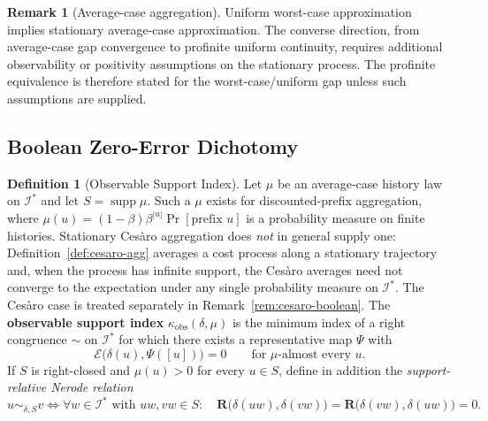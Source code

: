 \documentclass[12pt]{article}
\theoremstyle{definition}
\newtheorem{definition}[theorem]{Definition}
\newtheorem{remark}[theorem]{Remark}
\begin{document}
\begin{remark}[Average-case aggregation]
\label{rem:average-profinite}
Uniform worst-case approximation implies stationary average-case
approximation.  The converse direction, from average-case gap convergence to
profinite uniform continuity, requires additional observability or positivity
assumptions on the stationary process.  The profinite equivalence is therefore
stated for the worst-case/uniform gap unless such assumptions are supplied.
\end{remark}

\subsection{Boolean Zero-Error Dichotomy}
\label{subsec:meta-boolean}

\begin{definition}[Observable Support Index]
\label{def:observable-support-index}
Let $\mu$ be an average-case history law on $\mathcal I^*$ and let
$S=\operatorname{supp}\mu$.  Such a $\mu$ exists for discounted-prefix
aggregation, where
$\mu(u)=(1-\beta)\beta^{|u|}\Pr[\text{prefix }u]$ is a probability measure on
finite histories.  Stationary Ces\`aro aggregation does \emph{not} in general
supply one: Definition~\ref{def:cesaro-agg} averages a cost process along a
stationary trajectory and, when the process has infinite support, the Ces\`aro
averages need not converge to the expectation under any single probability
measure on $\mathcal I^*$.  The Ces\`aro case is treated separately in
Remark~\ref{rem:cesaro-boolean}.
The \textbf{observable support index} $\kappa_{\mathrm{obs}}(\delta,\mu)$ is
the minimum index of a right congruence $\sim$ on $\mathcal I^*$ for which
there exists a representative map $\Psi$ with
\[
\mathcal E\bigl(\delta(u),\Psi([u])\bigr)=0
\qquad
\text{for }\mu\text{-almost every }u .
\]
If $S$ is right-closed and $\mu(u)>0$ for every $u\in S$, define in addition
the \emph{support-relative Nerode relation}
\[
u\sim_{\delta,S}v
\iff
\forall w\in\mathcal I^*\text{ with }uw,vw\in S:\quad
\mathbf R\bigl(\delta(uw),\delta(vw)\bigr)
=
\mathbf R\bigl(\delta(vw),\delta(uw)\bigr)
=
0 .
\]
\end{definition}
\end{document}
